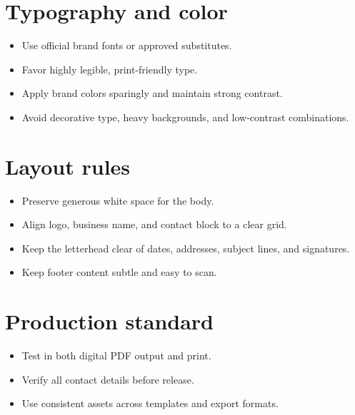 \documentclass[10pt]{article}
\begin{document}
\section*{Typography and color}
\begin{itemize}
  \item Use official brand fonts or approved substitutes.
  \item Favor highly legible, print-friendly type.
  \item Apply brand colors sparingly and maintain strong contrast.
  \item Avoid decorative type, heavy backgrounds, and low-contrast combinations.
\end{itemize}

\section*{Layout rules}
\begin{itemize}
  \item Preserve generous white space for the body.
  \item Align logo, business name, and contact block to a clear grid.
  \item Keep the letterhead clear of dates, addresses, subject lines, and signatures.
  \item Keep footer content subtle and easy to scan.
\end{itemize}

\section*{Production standard}
\begin{itemize}
  \item Test in both digital PDF output and print.
  \item Verify all contact details before release.
  \item Use consistent assets across templates and export formats.
\end{itemize}

\vspace{0.25em}
\begin{center}
\end{center}
\end{document}
